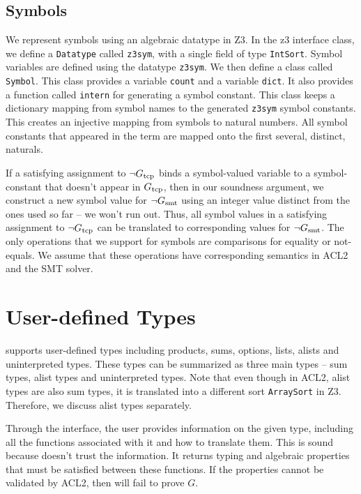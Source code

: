 \subsection{Symbols}\label{subsec:symbols}
We represent symbols using an algebraic datatype in Z3. In the z3 interface
class, we define a \texttt{Datatype} called \texttt{z3sym}, with a single field
of type \texttt{IntSort}. Symbol variables are defined using the datatype
\texttt{z3sym}. We then define a class called \texttt{Symbol}. This class
provides a variable \texttt{count} and a variable \texttt{dict}. It also
provides a function called \texttt{intern} for generating a symbol constant.
This class keeps a dictionary mapping from symbol names to the generated
\texttt{z3sym} symbol constants. This creates an injective mapping from symbols
to natural numbers. 
All symbol constants that appeared in the term are mapped onto the first
several, distinct, naturals.

If a satisfying assignment to $\neg G_{\mathrm{tcp}}$ binds a symbol-valued variable
to a symbol-constant that doesn't appear in $G_{\mathrm{tcp}}$, then in our soundness
argument, we construct a new symbol value for $\neg G_{\mathrm{smt}}$ using an integer
value distinct from the ones used so far -- we won't run out.
Thus, all symbol values in a satisfying assignment to $\neg G_{\mathrm{tcp}}$
can be translated to corresponding values for $\neg G_{\mathrm{smt}}$.
The only operations that we support for symbols are comparisons for equality or
not-equals.  We assume that these operations have corresponding semantics in
ACL2 and the SMT solver.

\section{User-defined Types}\label{sec:sounduserdefined}
\smtlink{} supports user-defined types including products, sums, options, lists,
alists and uninterpreted types. These types can be summarized as three main
types -- sum types, alist types and uninterpreted types.
Note that even though in ACL2, alist types are also sum types, it is translated
into a different sort \texttt{ArraySort} in Z3. Therefore, we discuss alist
types separately.

Through the \smtlink{} interface, the user provides information on the given
type, including all the functions associated with it and how to translate them.
This is sound because \smtlink{} doesn't trust the information. It returns
typing and algebraic properties that must be satisfied between these functions.
If the properties cannot be validated by ACL2, then \smtlink{} will fail to
prove $G$.

